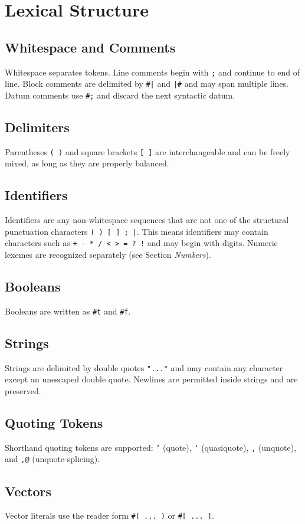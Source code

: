 \section{Lexical Structure}

\subsection*{Whitespace and Comments}
Whitespace separates tokens. Line comments begin with \texttt{;} and continue to
end of line. Block comments are delimited by \texttt{\#|} and \texttt{|\#} and
may span multiple lines. Datum comments use \texttt{\#;} and discard the next
syntactic datum.

\subsection*{Delimiters}
Parentheses \texttt{( )} and square brackets \texttt{[ ]} are interchangeable and
can be freely mixed, as long as they are properly balanced.

\subsection*{Identifiers}
Identifiers are any non-whitespace sequences that are not one of the structural
punctuation characters \texttt{( ) [ ] ; |}. This means identifiers may contain
characters such as \texttt{+ - * / < > = ? !} and may begin with digits. Numeric
lexemes are recognized separately (see Section \emph{Numbers}).

\subsection*{Booleans}
Booleans are written as \texttt{\#t} and \texttt{\#f}.

\subsection*{Strings}
Strings are delimited by double quotes \texttt{"..."} and may contain any
character except an unescaped double quote. Newlines are permitted inside
strings and are preserved.

\subsection*{Quoting Tokens}
Shorthand quoting tokens are supported: \texttt{'} (quote), \texttt{`} (quasiquote),
\texttt{,} (unquote), and \texttt{,@} (unquote-splicing).

\subsection*{Vectors}
Vector literals use the reader form \texttt{\#( ... )} or \texttt{\#[ ... ]}.
